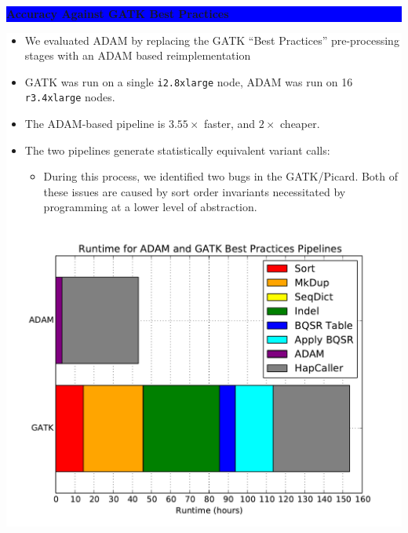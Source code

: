 \documentclass[11pt]{a0poster}
\begin{document}
{\begin{minipage}[t][2045pt][t]{\linewidth}
\begin{minipage}{0.6\linewidth}
\vspace{75pt}
\begin{minipage}{\linewidth}
\colorbox{Blue}{
\begin{minipage}[t]{\linewidth}
\vspace{30pt}
\begin{center}
\Huge \bf \color{White} Accuracy Against GATK Best Practices
\end{center}
\vspace{17pt}
\end{minipage}
}
\colorbox{White}{
\begin{minipage}[t][590pt][t]{\linewidth}
\begin{minipage}{0.005\linewidth}
\hfill
\pagebreak
\end{minipage}
\begin{minipage}{0.55\linewidth}
\LARGE
\color{Blue}
\begin{itemize}
\item We evaluated ADAM by replacing the GATK ``Best Practices'' pre-processing
stages with an ADAM based reimplementation
\item GATK was run on a single \texttt{i2.8xlarge} node, ADAM was run on 16
\texttt{r3.4xlarge} nodes.
\item The ADAM-based pipeline is $3.55\times$ faster, and $2\times$ cheaper.
\item The two pipelines generate statistically equivalent variant calls:
\begin{itemize}
\item During this process, we identified two bugs in the GATK/Picard.
Both of these issues are caused by sort order invariants necessitated by
programming at a lower level of abstraction.
\end{itemize}
\end{itemize}
\end{minipage}
\begin{minipage}{0.03\linewidth}
\hfill
\pagebreak
\end{minipage}
\begin{minipage}{0.4\linewidth}
\color{Blue}
\begin{center}
\end{center}
\color{Blue}
\begin{center}
\includegraphics[width=0.9\linewidth]{perf.pdf}

\end{center}
\end{minipage}
\end{minipage}}
\end{minipage}
\end{minipage}
\end{minipage}}
\end{document}
